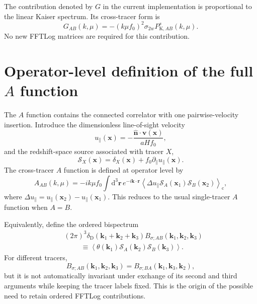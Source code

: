 \documentclass[11pt,a4paper]{article}
\newcommand{\bs}[1]{\boldsymbol{#1}}
\newcommand{\dd}{\mathrm{d}}
\newcommand{\PD}{\delta_{\mathrm{D}}}
\begin{document}
The contribution denoted by $G$ in the current implementation is proportional to the linear Kaiser spectrum. Its cross-tracer form is
\begin{equation}
    G_{AB}(k,\mu)
    =
    -(k\mu f_0)^2\sigma_{2w}
    P_{\mathrm{K},AB}^s(k,\mu).
\label{eq:G_cross}
\end{equation}
No new FFTLog matrices are required for this contribution.

\section{Operator-level definition of the full $A$ function}
\label{sec:A}

The $A$ function contains the connected correlator with one pairwise-velocity insertion. Introduce the dimensionless line-of-sight velocity
\begin{equation}
    u_{\parallel}(\bs{x})
    =
    -\frac{\hat{\bs{n}}\cdot\bs{v}(\bs{x})}{aHf_0},
\end{equation}
and the redshift-space source associated with tracer $X$,
\begin{equation}
    \mathcal{S}_X(\bs{x})
    =
    \delta_X(\bs{x})
    +f_0\partial_{\parallel}u_{\parallel}(\bs{x}).
\label{eq:redshift_source_X}
\end{equation}
The cross-tracer $A$ function is defined at operator level by
\begin{equation}
    A_{AB}(k,\mu)
    =
    -ik\mu f_0
    \int \dd^3\bs{r}\,
    e^{-i\bs{k}\cdot\bs{r}}
    \left\langle
        \Delta u_{\parallel}
        \mathcal{S}_A(\bs{x}_1)
        \mathcal{S}_B(\bs{x}_2)
    \right\rangle_{\mathrm{c}},
\label{eq:A_cross_configuration}
\end{equation}
where $\Delta u_{\parallel}=u_{\parallel}(\bs{x}_2)-u_{\parallel}(\bs{x}_1)$. This reduces to the usual single-tracer $A$ function when $A=B$.

Equivalently, define the ordered bispectrum
\begin{align}
    &(2\pi)^3\PD(\bs{k}_1+\bs{k}_2+\bs{k}_3)
    B_{\sigma;AB}(\bs{k}_1,\bs{k}_2,\bs{k}_3)
    \nonumber\\
    &\hspace{1cm}
    \equiv
    \left\langle
        \theta(\bs{k}_1)
        \mathcal{S}_A(\bs{k}_2)
        \mathcal{S}_B(\bs{k}_3)
    \right\rangle.
\label{eq:Bsigma_AB}
\end{align}
For different tracers,
\begin{equation}
    B_{\sigma;AB}(\bs{k}_1,\bs{k}_2,\bs{k}_3)
    =
    B_{\sigma;BA}(\bs{k}_1,\bs{k}_3,\bs{k}_2),
\end{equation}
but it is not automatically invariant under exchange of its second and third arguments while keeping the tracer labels fixed. This is the origin of the possible need to retain ordered FFTLog contributions.
\end{document}
